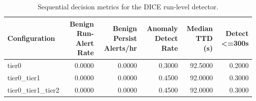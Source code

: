 \begin{table}[t]
\centering
\caption{Sequential decision metrics for the DICE run-level detector.}
\label{tab:dice_sequential_metrics}
\footnotesize
\begin{tabular}{lrrrrr}
\toprule
Configuration & Benign Run-Alert Rate & Benign Persist Alerts/hr & Anomaly Detect Rate & Median TTD (s) & Detect <=300s \\
\midrule
tier0 & 0.0000 & 0.0000 & 0.3000 & 92.5000 & 0.2000 \\
tier0_tier1 & 0.0000 & 0.0000 & 0.4500 & 92.0000 & 0.3000 \\
tier0_tier1_tier2 & 0.0000 & 0.0000 & 0.4500 & 92.0000 & 0.3000 \\
\bottomrule
\end{tabular}

\end{table}
